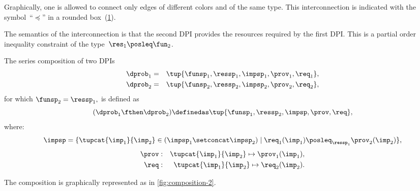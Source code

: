 Graphically, one is allowed to connect only edges of different colors and of the same type.
This interconnection is indicated with the symbol~``$\preceq$'' in a rounded box~(\cref{fig:connection}).

\begin{figure}[h]
  \centering
  \caption{\label{fig:connection}}
\end{figure}


The semantics of the interconnection is that the second DPI provides the resources required by the first DPI.
This is a partial order inequality constraint of the type~$\res_{1}\posleq\fun_{2}$.


\begin{definition}
  \label{def:series-composition}
  The series composition of two DPIs
  \begin{equation}
    \begin{aligned}
    \dprob_{1}&=&\tup{\funsp_{1},\ressp_{1},\impsp_{1},\prov_{1},\req_{1}},
  \\
    \dprob_{2}&=&\tup{\funsp_{2},\ressp_{2},\impsp_{2},\prov_{2},\req_{2}},
  \end{aligned}
  \end{equation}
  for which $\funsp_{2}=\ressp_{1},$ is defined as
  \begin{equation}
    (\dprob_{1} \fthen \dprob_{2})
    \definedas
    \tup{ \funsp_{1},\ressp_{2},\impsp,\prov,\req},
  \end{equation}
  where:
  \begin{equation}
    \impsp  =  \{  \tupcat {\imp_{1}} {\imp_{2}} \in (\impsp_{1} \setconcat \impsp_{2})\mid\req_{1}(\imp_{1})\posleq_{\ressp_{1}}\prov_{2}(\imp_{2})\},
  \end{equation}
  \begin{equation}
  \begin{aligned}
    \prov & : & \tupcat {\imp_{1}} {\imp_{2}}   \mapsto\prov_{1}(\imp_{1}),\\
    \req & : & \tupcat {\imp_{1}} {\imp_{2}} \mapsto\req_{2}(\imp_{2}).
  \end{aligned}
  \end{equation}
\end{definition}

The composition is graphically represented as in \cref{fig:composition-2}.

